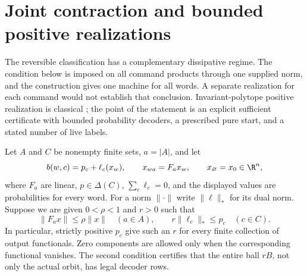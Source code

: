\section{Joint contraction and bounded positive realizations}
\label{sec:r74-joint-contraction}

The reversible classification has a complementary dissipative regime. The
condition below is imposed on all command products through one supplied norm,
and the construction gives one machine for all words. A separate realization
for each command would not establish that conclusion. Invariant-polytope
positive realization is classical \cite{Heller65,MonrasWinter14}; the point of
the statement is an explicit sufficient certificate with bounded probability
decoders, a prescribed pure start, and a stated number of live labels.

Let $A$ and $C$ be nonempty finite sets, $a=|A|$, and let
\begin{equation}\label{eq:r74-contracting-response}
 b(w,c)=p_c+\ell_c(x_w),\qquad
 x_{wa}=F_ax_w,\qquad x_\varnothing=x_0\in\R^n,
\end{equation}
where $F_a$ are linear, $p\in\Delta(C)$, $\sum_c\ell_c=0$, and the displayed
values are probabilities for every word. For a norm $\|\cdot\|$ write
$\|\ell\|_*$ for its dual norm. Suppose we are given $0<\rho<1$ and $r>0$
such that
\begin{equation}\label{eq:r74-contraction-certificate}
 \|F_ax\|\le\rho\|x\|\quad(a\in A),\qquad
 r\|\ell_c\|_*\le p_c\quad(c\in C).
\end{equation}
In particular, strictly positive $p_c$ give such an $r$ for every finite
collection of output functionals. Zero components are allowed only when the
corresponding functional vanishes. The second condition certifies that the
entire ball $rB$, not only the actual orbit, has legal decoder rows.

